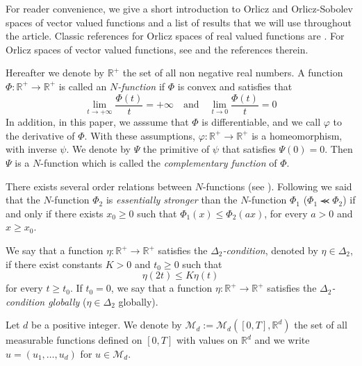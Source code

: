 \documentclass[twoside]{article}
\theoremstyle{remark}
\newcommand{\rr}{\mathbb{R}}
\renewcommand{\leq}{\leqslant}
\renewcommand{\geq}{\geqslant}
\begin{document}
For reader convenience, we give a short introduction to Orlicz and Orlicz-Sobolev spaces of vector valued functions and a  list  of results that we will use throughout the article. 
Classic references for Orlicz spaces of real valued functions are \cite{adams_sobolev,KR,rao1991theory}.
For  Orlicz spaces of vector valued functions, see \cite{Orliczvectorial2005} and the references therein.

Hereafter we denote  by $\mathbb{R}^+$  the set of all non negative real numbers. A function $\Phi:\mathbb{R}^+\to \mathbb{R}^+ $ is called an \emph{$N$-function} if $\Phi$ is convex and satisfies that
\[
\lim_{t\to+\infty}\frac{\Phi(t)}{t}=+\infty\quad\text{and}\quad \lim_{t\to 0}\frac{\Phi(t)}{t}=0
\]
In addition,  in this paper,  we asssume that $\Phi$ is differentiable, and we call $\varphi$ to the derivative of $\Phi$. With these assumptions, $\varphi:\mathbb{R}^+\rightarrow \mathbb{R}^+$ is a homeomorphism, with inverse $\psi$. We denote by $\Psi$ the primitive of $\psi$ that satisfies $\Psi(0)=0$. Then $\Psi$ is a $N$-function which  is called the \emph{complementary function} of $\Phi$.


There exists several order relations between $N$-functions (see \cite[Section 2.2]{rao1991theory}). Following \cite[Def. 1, p.15]{rao1991theory} we said that the $N$-function $\Phi_2$ is \emph{essentially stronger} than the $N$-function  $\Phi_1$  ($\Phi_1\llcurly\Phi_2$) if and only if there exists $x_0\geq 0$ such that $\Phi_1(x)\leq \Phi_2(ax)$, for every $a>0$ and $x\geq x_0$.






We say that a function $\eta:\mathbb{R}^+\rightarrow \mathbb{R}^+$ satisfies the  \emph{$\Delta_2$-condition}, denoted by $\eta \in \Delta_2$,
if there exist  constants $K>0$ and  $t_0\geq 0$ such that 
\begin{equation}\label{delta2defi}\eta(2t)\leq K\eta(t)
\end{equation}
for every $t\geq t_0$. 
If $t_0=0$,  we say that a function   $\eta:\mathbb{R}^+\rightarrow \mathbb{R}^+$ satisfies the \emph{$\Delta_2$-condition globally} ($\eta \in \Delta_2$ globally).


Let $d$ be a positive integer. We denote by $\mathcal{M}_d:=\mathcal{M}_d([0,T],\rr^d)$ the set of all measurable functions defined on $[0,T]$ with values on $\mathbb{R}^d$ and  we write $u=(u_1,\dots,u_d)$ for  $u\in \mathcal{M}_d$.
\end{document}
